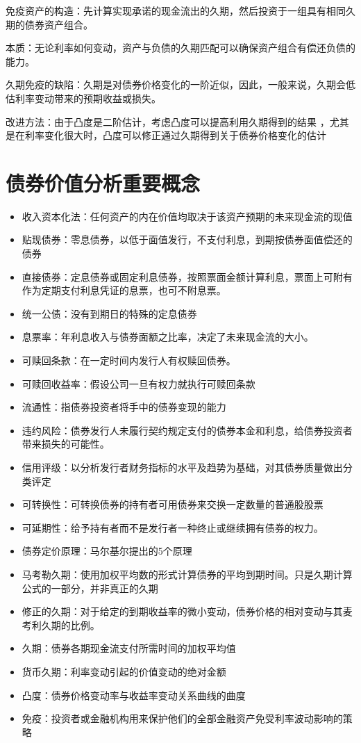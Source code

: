 \documentclass{article}
\begin{document}
免疫资产的构造：先计算实现承诺的现金流出的久期，然后投资于一组具有相同久期的债券资产组合。

本质：无论利率如何变动，资产与负债的久期匹配可以确保资产组合有偿还负债的能力。

久期免疫的缺陷：久期是对债券价格变化的一阶近似，因此，一般来说，久期会低估利率变动带来的预期收益或损失。

改进方法：由于凸度是二阶估计，考虑凸度可以提高利用久期得到的结果 ，尤其是在利率变化很大时，凸度可以修正通过久期得到关于债券价格变化的估计

\clearpage
\section*{\center 债券价值分析重要概念}
\begin{tcolorbox}
    \begin{itemize}
        \item 收入资本化法：任何资产的内在价值均取决于该资产预期的未来现金流的现值
        \item 贴现债券：零息债券，以低于面值发行，不支付利息，到期按债券面值偿还的债券
        \item 直接债券：定息债券或固定利息债券，按照票面金额计算利息，票面上可附有作为定期支付利息凭证的息票，也可不附息票。
        \item 统一公债：没有到期日的特殊的定息债券
        \item 息票率：年利息收入与债券面额之比率，决定了未来现金流的大小。
        \item 可赎回条款：在一定时间内发行人有权赎回债券。
        \item 可赎回收益率：假设公司一旦有权力就执行可赎回条款
        \item 流通性：指债券投资者将手中的债券变现的能力
        \item 违约风险：债券发行人未履行契约规定支付的债券本金和利息，给债券投资者带来损失的可能性。
        \item 信用评级：以分析发行者财务指标的水平及趋势为基础，对其债券质量做出分类评定
        \item 可转换性：可转换债券的持有者可用债券来交换一定数量的普通股股票
        \item 可延期性：给予持有者而不是发行者一种终止或继续拥有债券的权力。
        \item 债券定价原理：马尔基尔提出的5个原理
        \item 马考勒久期：使用加权平均数的形式计算债券的平均到期时间。只是久期计算公式的一部分，并非真正的久期
        \item 修正的久期：对于给定的到期收益率的微小变动，债券价格的相对变动与其麦考利久期的比例。
        \item 久期：债券各期现金流支付所需时间的加权平均值
        \item 货币久期：利率变动引起的价值变动的绝对金额
        \item 凸度：债券价格变动率与收益率变动关系曲线的曲度
        \item 免疫：投资者或金融机构用来保护他们的全部金融资产免受利率波动影响的策略
    \end{itemize}
\end{tcolorbox}
\end{document}
